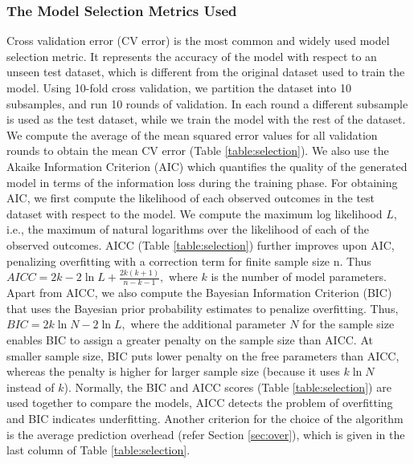 \documentclass[conference]{IEEEtran}
\begin{document}
\subsubsection{The Model Selection Metrics Used}\label{sec:metricsused}
Cross validation error (CV error) \cite{Flach:2012:MLA:2490546} is the most common and widely used model selection metric. It represents the accuracy of the model with respect to an unseen test dataset, which is different from the original dataset used to train the model.  Using 10-fold cross validation, we partition the dataset into 10 subsamples, and run 10 rounds of validation. In each round a different subsample is used as the test dataset, while we train the model with the rest of the dataset. We compute the average of the mean squared error values for all validation rounds to obtain the mean CV error (Table \ref{table:selection}).
  We also use the Akaike Information Criterion (AIC) \cite{burnham2002model} which quantifies the quality of the generated model in terms of the information loss during the  training phase. For obtaining AIC, we first compute the likelihood of each observed outcomes in the test dataset with respect to the model. We compute the maximum log likelihood $L$, i.e.,  the maximum of natural logarithms over the likelihood of each of the observed outcomes. AICC \cite{burnham2002model} (Table \ref{table:selection}) further improves upon AIC, penalizing overfitting with a correction term for finite sample size n. Thus $\mathit{AICC} = 2k - 2\ln L + \frac{2k(k+1)}{n-k-1},$ where $k$ is the number of model parameters.
  Apart from AICC, we also compute the Bayesian Information Criterion (BIC) \cite{burnham2002model} that uses the Bayesian prior probability estimates to penalize overfitting. Thus, $\mathit{BIC} = 2 k\ln N  - 2\ln L,$ where the additional parameter $N$ for the sample size enables BIC to assign a greater penalty on the sample size than AICC. At smaller sample size, BIC puts lower penalty on the free parameters than AICC, whereas the penalty is higher for larger sample size (because it uses $k \ln N$ instead of $k$). Normally, the BIC and AICC scores (Table \ref{table:selection}) are used together to compare the models, AICC detects the problem of overfitting and BIC indicates underfitting. Another criterion for the choice of the algorithm is the average prediction overhead (refer Section \ref{sec:over}), which is given in the last column of Table \ref{table:selection}.
\end{document}

